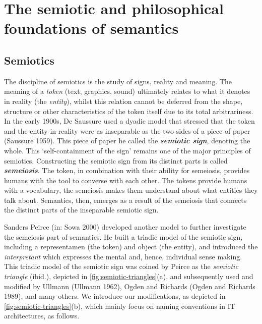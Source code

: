 \documentclass[a4paper,11pt,oneside,oldfontcommands]{memoir}
\newcounter{para}
\theoremstyle{definition}
\theoremstyle{break}		%
\numberwithin{equation}{chapter}
\numberwithin{figure}{chapter}
\begin{document}
\hypertarget{the-semiotic-and-philosophical-foundations-of-semantics}{%
\chapter{The semiotic and philosophical foundations of
semantics}\label{the-semiotic-and-philosophical-foundations-of-semantics}}

\hypertarget{semiotics}{%
\section{Semiotics}\label{semiotics}}

The discipline of semiotics is the study of signs, reality and meaning.
The meaning of a \emph{token} (text, graphics, sound) ultimately relates
to what it denotes in reality (the \emph{entity}), whilst this relation
cannot be deferred from the shape, structure or other characteristics of
the token itself due to its total arbitrariness. In the early 1900s, De
Saussure used a dyadic model that stressed that the token and the entity
in reality were as inseparable as the two sides of a piece of paper
(Saussure 1959). This piece of paper he called the
\textbf{\emph{semiotic sign}}, denoting the whole. This
`self-containment of the sign' remains one of the major principles of
semiotics. Constructing the semiotic sign from its distinct parts is
called \textbf{\emph{semeiosis}}. The token, in combination with their
ability for semeiosis, provides humans with the tool to converse with
each other. The tokens provide humans with a vocabulary, the semeiosis
makes them understand about what entities they talk about. Semantics,
then, emerges as a result of the semeiosis that connects the distinct
parts of the inseparable semiotic sign.

Sanders Peirce (in: Sowa 2000) developed another model to further
investigate the semeiosis part of semantics. He built a triadic model of
the semiotic sign, including a representamen (the token) and object (the
entity), and introduced the \emph{interpretant} which expresses the
mental and, hence, individual sense making. This triadic model of the
semiotic sign was coined by Peirce as the \emph{semiotic triangle}
(ibid.), depicted in \cref{fig:semiotic-triangles}(a), and subsequently
used and modified by Ullmann (Ullmann 1962), Ogden and Richards (Ogden
and Richards 1989), and many others. We introduce our modifications, as
depicted in \cref{fig:semiotic-triangles}(b), which mainly focus on
naming conventions in IT architectures, as follows.
\end{document}
